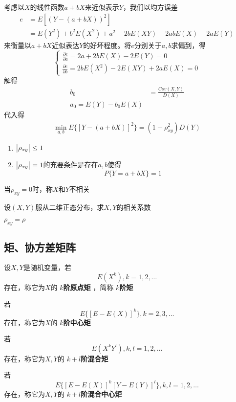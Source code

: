 \documentclass[11pt]{article}
\begin{document}
考虑以\(X\)的线性函数\(a+bX\)来近似表示\(Y\)，我们以均方误差
\begin{align*}
e&=E[(Y-(a+bX))^2]\\
&=E(Y^2)+b^2E(X^2)+a^2-2bE(XY)+2abE(X)-2aE(Y)
\end{align*}
来衡量以\(a+bX\)近似表达\(Y\)的好坏程度。将\(e\)分别关于\(a,b\)求偏到，得
\begin{equation*}
\begin{cases}
\frac{\partial e}{\partial a}=2a+2bE(X)-2E(Y)=0\\
\frac{\partial e}{\partial b}=2bE(X^2)-2E(XY)+2aE(X)=0
\end{cases}
\end{equation*}
解得
\begin{align*}
b_0&=\frac{Cov(X,Y)}{D(X)}\\
a_0=E(Y)-b_0E(X)
\end{align*}
代入得
\begin{align*}
\min_{a,b}E\{[Y-(a+bX)]^2\}=(1-\rho^2_{xy})D(Y)
\end{align*}
\begin{theorem}[]
\begin{enumerate}
\item \(\abs{\rho_{xy}}\le1\)
\item \(\abs{\rho_{xy}}=1\)的充要条件是存在\(a,b\)使得
\begin{equation*}
P\{Y=a+bX\}=1
\end{equation*}
\end{enumerate}
\end{theorem}

当\(\rho_{xy}=0\)时，称\(X\)和\(Y\)不相关

\begin{examplle}[]
设\((X,Y)\)服从二维正态分布，求\(X,Y\)的相关系数

\(\rho_{xy}=\rho\)
\end{examplle}
\subsection{矩、协方差矩阵}
\label{sec:org32d84cc}
\begin{definition}[]
设\(X,Y\)是随机变量，若
\begin{equation*}
E(X^k),k=1,2,\dots
\end{equation*}
存在，称它为\(X\)的 \textbf{\(k\)阶原点矩} ，简称 \textbf{\(k\)阶矩}

若
\begin{equation*}
E\{[E-E(X)]^k\},k=2,3,\dots
\end{equation*}
存在，称它为\(X\)的 \textbf{\(k\)阶中心矩}

若
\begin{equation*}
E(X^kY^l),k,l=1,2,\dots
\end{equation*}
存在，称它为\(X,Y\)的 \textbf{\(k+l\)阶混合矩}

若
\begin{equation*}
E\{[E-E(X)]^k[Y-E(Y)]^l\},k,l=1,2,\dots
\end{equation*}
存在，称它为\(X,Y\)的 \textbf{\(k+l\)阶混合中心矩}
\end{definition}
\end{document}
